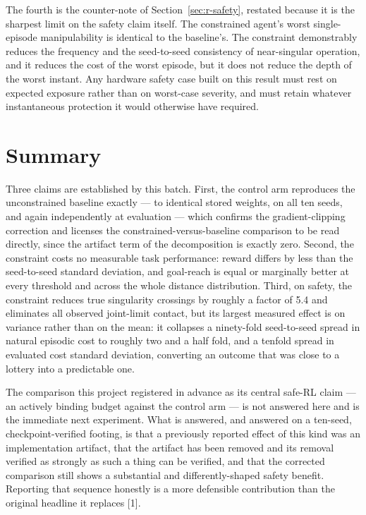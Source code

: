 The fourth is the counter-note of Section~\ref{sec:r-safety}, restated because it is the sharpest limit on the
safety claim itself. The constrained agent's worst single-episode manipulability is identical to
the baseline's. The constraint demonstrably reduces the frequency and the seed-to-seed consistency
of near-singular operation, and it reduces the cost of the worst episode, but it does not reduce
the depth of the worst instant. Any hardware safety case built on this result must rest on
expected exposure rather than on worst-case severity, and must retain whatever instantaneous
protection it would otherwise have required.


\section{Summary}\label{sec:r-summary}

Three claims are established by this batch. First, the control arm reproduces the unconstrained
baseline exactly --- to identical stored weights, on all ten seeds, and again independently at
evaluation --- which confirms the gradient-clipping correction and licenses the constrained-versus-baseline
comparison to be read directly, since the artifact term of the decomposition is exactly zero.
Second, the constraint costs no measurable task performance: reward differs by less than the
seed-to-seed standard deviation, and goal-reach is equal or marginally better at every threshold
and across the whole distance distribution. Third, on safety, the constraint reduces true
singularity crossings by roughly a factor of 5.4 and eliminates all observed joint-limit contact,
but its largest measured effect is on variance rather than on the mean: it collapses a
ninety-fold seed-to-seed spread in natural episodic cost to roughly two and a half fold, and a
tenfold spread in evaluated cost standard deviation, converting an outcome that was close to a
lottery into a predictable one.

The comparison this project registered in advance as its central safe-RL claim --- an actively
binding budget against the control arm --- is not answered here and is the immediate next
experiment. What is answered, and answered on a ten-seed, checkpoint-verified footing, is that a
previously reported effect of this kind was an implementation artifact, that the artifact has been
removed and its removal verified as strongly as such a thing can be verified, and that the
corrected comparison still shows a substantial and differently-shaped safety benefit. Reporting
that sequence honestly is a more defensible contribution than the original headline it replaces
{[}1{]}.

